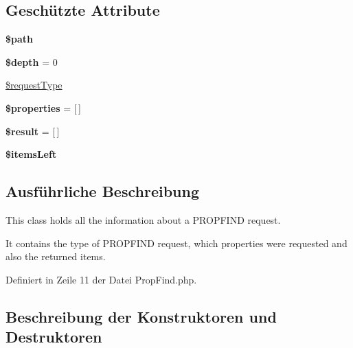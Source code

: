 \subsection*{Geschützte Attribute}
\begin{DoxyCompactItemize}
\item 
\mbox{\label{class_sabre_1_1_d_a_v_1_1_prop_find_a0c21eee30c879289b34427d180ebe6af}} 
{\bfseries \$path}
\item 
\mbox{\label{class_sabre_1_1_d_a_v_1_1_prop_find_ae5a0b6b5282584652a50acde2d621cdc}} 
{\bfseries \$depth} = 0
\item 
\mbox{\hyperlink{class_sabre_1_1_d_a_v_1_1_prop_find_ab3d440b2741c4ba136ed29b60bf022e7}{\$request\+Type}}
\item 
\mbox{\label{class_sabre_1_1_d_a_v_1_1_prop_find_a98464604bfb7fbaa9bd4e00745f3e3ff}} 
{\bfseries \$properties} = \mbox{[}$\,$\mbox{]}
\item 
\mbox{\label{class_sabre_1_1_d_a_v_1_1_prop_find_aa2794010496a6b4d89909df3f27b365c}} 
{\bfseries \$result} = \mbox{[}$\,$\mbox{]}
\item 
\mbox{\label{class_sabre_1_1_d_a_v_1_1_prop_find_a2112a7ef92d8c4cf22b6989352547969}} 
{\bfseries \$items\+Left}
\end{DoxyCompactItemize}


\subsection{Ausführliche Beschreibung}
This class holds all the information about a P\+R\+O\+P\+F\+I\+ND request.

It contains the type of P\+R\+O\+P\+F\+I\+ND request, which properties were requested and also the returned items. 

Definiert in Zeile 11 der Datei Prop\+Find.\+php.



\subsection{Beschreibung der Konstruktoren und Destruktoren}
\mbox{\label{class_sabre_1_1_d_a_v_1_1_prop_find_ad461b10ee0b27a9917bd829e86ce0f10}} 
